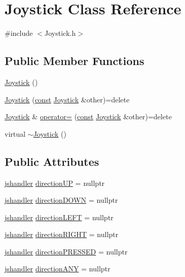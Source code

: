 \hypertarget{class_joystick}{}\section{Joystick Class Reference}
\label{class_joystick}


{\ttfamily \#include $<$Joystick.\+h$>$}

\subsection*{Public Member Functions}
\begin{DoxyCompactItemize}
\item 
\hyperlink{class_joystick_a158b1f77b78717efbf1b8fac43b1fcef}{Joystick} ()
\item 
\hyperlink{class_joystick_aee767adfa96c50ebb6ca1af13ddb6187}{Joystick} (\hyperlink{functions__c_8js_afacfd9c985d225bb07483b887a801b6f}{const} \hyperlink{class_joystick}{Joystick} \&other)=delete
\item 
\hyperlink{class_joystick}{Joystick} \& \hyperlink{class_joystick_ad5b1112a556aba93875e60e70a2f6643}{operator=} (\hyperlink{functions__c_8js_afacfd9c985d225bb07483b887a801b6f}{const} \hyperlink{class_joystick}{Joystick} \&other)=delete
\item 
virtual \hyperlink{class_joystick_a23429c0470e1a32b8de61e1ad7c251c1}{$\sim$\+Joystick} ()
\end{DoxyCompactItemize}
\subsection*{Public Attributes}
\begin{DoxyCompactItemize}
\item 
\hyperlink{_joystick_8h_a76b70dda4842c659a65f6b5ebf8685c6}{jshandler} \hyperlink{class_joystick_a24b286e28a1e3ada2bc42c4b1ef16339}{direction\+UP} = nullptr
\item 
\hyperlink{_joystick_8h_a76b70dda4842c659a65f6b5ebf8685c6}{jshandler} \hyperlink{class_joystick_aca32b8875e35bd9af63065e0d5dfafb9}{direction\+D\+O\+WN} = nullptr
\item 
\hyperlink{_joystick_8h_a76b70dda4842c659a65f6b5ebf8685c6}{jshandler} \hyperlink{class_joystick_a0a7fa96faefa92d2f2e09251b460b5ed}{direction\+L\+E\+FT} = nullptr
\item 
\hyperlink{_joystick_8h_a76b70dda4842c659a65f6b5ebf8685c6}{jshandler} \hyperlink{class_joystick_a6fcd661de0e47977ebfddd1950004bd1}{direction\+R\+I\+G\+HT} = nullptr
\item 
\hyperlink{_joystick_8h_a76b70dda4842c659a65f6b5ebf8685c6}{jshandler} \hyperlink{class_joystick_ab7b8181af7f4b77fe567c9fe2b00cf89}{direction\+P\+R\+E\+S\+S\+ED} = nullptr
\item 
\hyperlink{_joystick_8h_a76b70dda4842c659a65f6b5ebf8685c6}{jshandler} \hyperlink{class_joystick_a9699d1491b81b53353a30cfc675ef188}{direction\+A\+NY} = nullptr
\end{DoxyCompactItemize}

